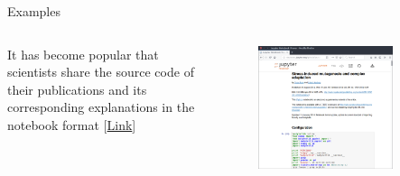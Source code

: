 \documentclass[11pt,t]{beamer}
\begin{document}
\begin{frame}[fragile]{Examples}  

	\begin{columns}[t]
		\begin{column}{.3\textwidth}
		It has become popular that scientists share the source code of their publications and its corresponding explanations in the notebook format [\href{http://nbviewer.jupyter.org/github/yoavram/ruggedsim/blob/master/manuscript/supplementry.ipynb}{Link}]
	
 
		\end{column}
		\begin{column}{.7\textwidth}
			\vspace{-55pt}
			\begin{figure}
			\centering
			\includegraphics[width=0.80\textwidth]{jupyter_ex_art}
			
			\end{figure}
		\end{column}
	\end{columns}	
		
\end{frame}
\end{document}
